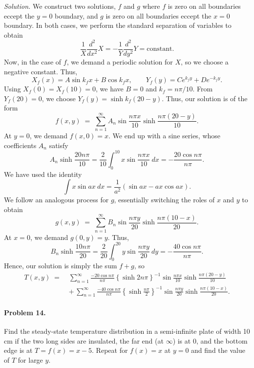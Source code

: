\documentclass[10pt]{article}
\newcommand\dd[3][]{\frac{d^{#1}{#2}}{d {#3}^{#1}}}
\begin{document}
        \textit{Solution.} We construct two solutions, $f$ and $g$ where $f$ is zero on all boundaries eccept the $y = 0$ boundary,
        and $g$ is zero on all boundaries eccept the $x = 0$ boundary. In both cases, we perform the standard separation of variables
        to obtain
        \[
                \frac{1}{X}\dd[2]{}{x}X = -\frac{1}{Y}\dd[2]{}{y}Y = \text{constant}.
        \]
        Now, in the case of $f$, we demand a periodic solution for $X$, so we choose a negative constant. Thus,
        \[
                X_f(x) = A\sin{k_f x} + B\cos{k_f x}, \quad\quad Y_f(y) = Ce^{k_f y} + De^{-k_f y}.
        \]
        Using $X_f(0) = X_f(10) = 0$, we have $B = 0$ and $k_f = n \pi / 10$. From $Y_f(20) = 0$, we choose $Y_f(y) = \sinh{k_f(20 - y)}$.
        Thus, our solution is of the form
        \[
                f(x, y) \;=\; \sum_{n = 1}^\infty A_n \sin{\frac{n\pi x}{10}}\sinh{\frac{n \pi (20 - y)}{10}}.
        \]
        At $y = 0$, we demand $f(x, 0) = x$. We end up with a sine series, whose coefficients $A_n$ satisfy
        \[
                A_n\sinh\frac{20 n \pi}{10} = \frac{2}{10}\int_{0}^{10} x \sin\frac{n\pi x}{10} \:dx =
                        - \frac{20\cos{n\pi}}{n\pi}.
        \]
        We have used the identity
        \[
                \int x\sin{ax}\:dx = \frac{1}{a^2}(\sin{ax} - ax\cos{ax}).
        \]
        We follow an analogous process for $g$, essentially switching the roles of $x$ and $y$ to obtain
        \[
                g(x, y) \;=\; \sum_{n = 1}^\infty B_n \sin{\frac{n\pi y}{20}}\sinh{\frac{n \pi (10 - x)}{20}}.
        \]
        At $x = 0$, we demand $g(0, y) = y$. Thus, 
        \[
                B_n\sinh\frac{10 n \pi}{20} = \frac{2}{20}\int_{0}^{20} y \sin\frac{n\pi y}{20} \:dy =
                        - \frac{40\cos{n\pi}}{n\pi}.
        \]
        Hence, our solution is simply the sum $f + g$, so 
        \begin{align*}
                T(x, y) \;=\; &\sum_{n = 1}^\infty \frac{-20\cos{n\pi}}{n\pi}\left\{\sinh{2n\pi}\right\}^{-1}
                                        \sin{\frac{n\pi x}{10}}\sinh{\frac{n \pi (20 - y)}{10}} \\
                        &+\, \sum_{n = 1}^\infty \frac{-40\cos{n\pi}}{n\pi}\left\{\sinh\frac{n\pi}{2}\right\}^{-1}
                                        \sin{\frac{n\pi y}{20}}\sinh{\frac{n \pi (10 - x)}{20}}.
        \end{align*}

        \paragraph{Problem 14.} Find the steady-state temperature distribution in a semi-infinite plate of width 10 cm if the two long
        sides are insulated, the far end (at $\infty$) is at $0$, and the bottom edge is at $T = f(x) = x - 5$. Repeat for
        $f(x) = x$ at $y = 0$ and find the value of $T$ for large $y$. \\
\end{document}

